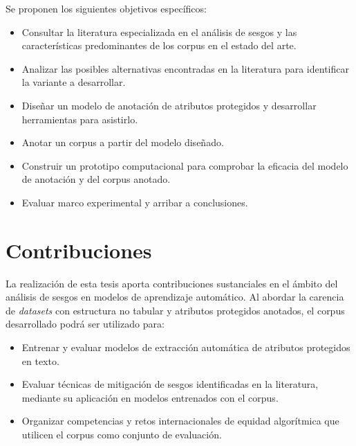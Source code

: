 Se proponen los siguientes objetivos espec\'ificos:
\begin{itemize}
    \item Consultar la literatura especializada en el an\'alisis de sesgos y las caracter\'isticas predominantes de los corpus en el estado del arte.
    \item Analizar las posibles alternativas encontradas en la literatura para identificar la variante a desarrollar.
    \item Dise\~nar un modelo de anotaci\'on de atributos protegidos y desarrollar herramientas para asistirlo.
    \item Anotar un corpus a partir del modelo dise\~nado.
    \item Construir un prototipo computacional para comprobar la eficacia del modelo de anotaci\'on y del corpus anotado.
    \item Evaluar marco experimental y arribar a conclusiones.
\end{itemize}

\section*{Contribuciones}
La realizaci\'on de esta tesis aporta contribuciones sustanciales en el \'ambito del an\'alisis de sesgos en modelos de aprendizaje 
autom\'atico. Al abordar la carencia de \emph{datasets} con estructura no tabular y atributos protegidos anotados, el corpus 
desarrollado podr\'a ser utilizado para:
\begin{itemize}
    \item Entrenar y evaluar modelos de extracci\'on autom\'atica de atributos protegidos en texto.
    \item Evaluar t\'ecnicas de mitigaci\'on de sesgos identificadas en la literatura, mediante su aplicaci\'on en 
    modelos entrenados con el corpus.
    \item Organizar competencias y retos internacionales de equidad algor\'itmica que utilicen el corpus como conjunto de evaluaci\'on.
\end{itemize}



